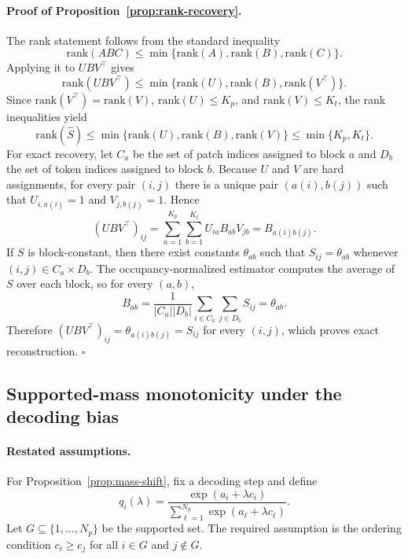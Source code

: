 \documentclass[11pt,a4paper]{article}
\begin{document}
\paragraph{Proof of Proposition~\ref{prop:rank-recovery}.}
The rank statement follows from the standard inequality
\[
\mathrm{rank}(ABC) \le \min\{\mathrm{rank}(A),\mathrm{rank}(B),\mathrm{rank}(C)\}.
\]
Applying it to $UBV^\top$ gives
\[
\mathrm{rank}(UBV^\top) \le \min\{\mathrm{rank}(U),\mathrm{rank}(B),\mathrm{rank}(V^\top)\}.
\]
Since $\mathrm{rank}(V^\top)=\mathrm{rank}(V)$, $\mathrm{rank}(U)\le K_p$, and $\mathrm{rank}(V)\le K_t$, the rank inequalities yield
\[
\mathrm{rank}(\hat S) \le \min\{\mathrm{rank}(U),\mathrm{rank}(B),\mathrm{rank}(V)\} \le \min\{K_p,K_t\}.
\]
For exact recovery, let $C_a$ be the set of patch indices assigned to block $a$ and $D_b$ the set of token indices assigned to block $b$. Because $U$ and $V$ are hard assignments, for every pair $(i,j)$ there is a unique pair $(a(i),b(j))$ such that $U_{i,a(i)}=1$ and $V_{j,b(j)}=1$. Hence
\[
(UBV^\top)_{ij} = \sum_{a=1}^{K_p}\sum_{b=1}^{K_t} U_{ia}B_{ab}V_{jb} = B_{a(i)b(j)}.
\]
If $S$ is block-constant, then there exist constants $\theta_{ab}$ such that $S_{ij}=\theta_{ab}$ whenever $(i,j)\in C_a\times D_b$. The occupancy-normalized estimator computes the average of $S$ over each block, so for every $(a,b)$,
\[
B_{ab} = \frac{1}{|C_a||D_b|}\sum_{i\in C_a}\sum_{j\in D_b} S_{ij} = \theta_{ab}.
\]
Therefore $(UBV^\top)_{ij}=\theta_{a(i)b(j)}=S_{ij}$ for every $(i,j)$, which proves exact reconstruction. \hfill $\square$

\subsection{Supported-mass monotonicity under the decoding bias}

\paragraph{Restated assumptions.}
For Proposition~\ref{prop:mass-shift}, fix a decoding step and define
\[
q_i(\lambda) = \frac{\exp(a_i + \lambda c_i)}{\sum_{\ell=1}^{N_p}\exp(a_\ell + \lambda c_\ell)}.
\]
Let $G\subseteq\{1,\dots,N_p\}$ be the supported set. The required assumption is the ordering condition $c_i\ge c_j$ for all $i\in G$ and $j\notin G$.
\end{document}
